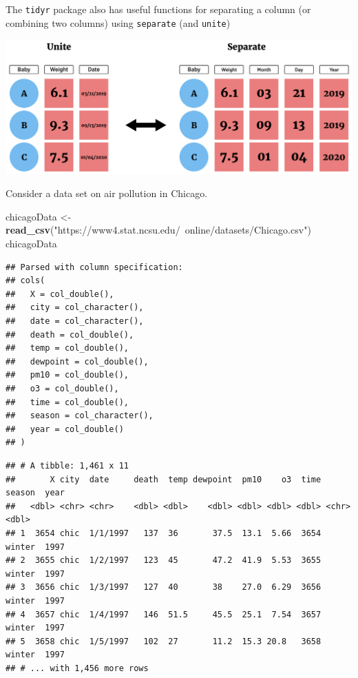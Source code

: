 \documentclass[
]{book}
\newenvironment{Shaded}{\begin{snugshade}}{\end{snugshade}}
\newcommand{\KeywordTok}[1]{\textcolor[rgb]{0.13,0.29,0.53}{\textbf{#1}}}
\newcommand{\NormalTok}[1]{#1}
\newcommand{\StringTok}[1]{\textcolor[rgb]{0.31,0.60,0.02}{#1}}
\theoremstyle{definition}
\theoremstyle{definition}
\theoremstyle{definition}
\theoremstyle{remark}
\begin{document}
The \texttt{tidyr} package also has useful functions for separating a column (or combining two columns) using \texttt{separate} (and \texttt{unite})

\begin{center}\includegraphics[width=0.8\linewidth]{img/uniteSeparateF} \end{center}

Consider a data set on air pollution in Chicago.

\begin{Shaded}
\begin{Highlighting}[]
\NormalTok{chicagoData <-}\StringTok{ }\KeywordTok{read_csv}\NormalTok{(}\StringTok{"https://www4.stat.ncsu.edu/~online/datasets/Chicago.csv"}\NormalTok{)}
\NormalTok{chicagoData}
\end{Highlighting}
\end{Shaded}

\begin{verbatim}
## Parsed with column specification:
## cols(
##   X = col_double(),
##   city = col_character(),
##   date = col_character(),
##   death = col_double(),
##   temp = col_double(),
##   dewpoint = col_double(),
##   pm10 = col_double(),
##   o3 = col_double(),
##   time = col_double(),
##   season = col_character(),
##   year = col_double()
## )
\end{verbatim}

\begin{verbatim}
## # A tibble: 1,461 x 11
##       X city  date     death  temp dewpoint  pm10    o3  time season  year
##   <dbl> <chr> <chr>    <dbl> <dbl>    <dbl> <dbl> <dbl> <dbl> <chr>  <dbl>
## 1  3654 chic  1/1/1997   137  36       37.5  13.1  5.66  3654 winter  1997
## 2  3655 chic  1/2/1997   123  45       47.2  41.9  5.53  3655 winter  1997
## 3  3656 chic  1/3/1997   127  40       38    27.0  6.29  3656 winter  1997
## 4  3657 chic  1/4/1997   146  51.5     45.5  25.1  7.54  3657 winter  1997
## 5  3658 chic  1/5/1997   102  27       11.2  15.3 20.8   3658 winter  1997
## # ... with 1,456 more rows
\end{verbatim}
\end{document}
